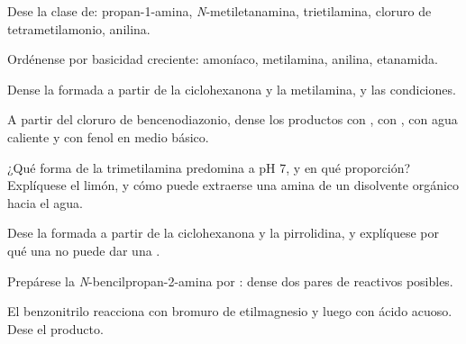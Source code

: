 \begin{exercise}[$\star$]\label{exo:b2:amines:1}
Dese la clase de: propan-1-amina, \textit{N}-metiletanamina, trietilamina,
cloruro de tetrametilamonio, anilina.
\end{exercise}

\begin{exercise}[$\star$]\label{exo:b2:amines:2}
Ordénense por basicidad creciente: amoníaco, metilamina, anilina, etanamida.
\end{exercise}

\begin{exercise}[$\star$]\label{exo:b2:amines:3}
Dense la  formada a partir de la ciclohexanona y la metilamina, y las condiciones.
\end{exercise}

\begin{exercise}[$\star$]\label{exo:b2:amines:4}
A partir del cloruro de bencenodiazonio, dense los productos con , con , con agua caliente
y con fenol en medio básico.
\end{exercise}

\begin{exercise}[$\star\star$]\label{exo:b2:amines:5}
¿Qué forma de la trimetilamina predomina a pH 7, y en qué proporción? Explíquese el limón, y cómo puede
extraerse una amina de un disolvente orgánico hacia el agua.
\end{exercise}

\begin{exercise}[$\star\star$]\label{exo:b2:amines:6}
Dese la  formada a partir de la ciclohexanona y la pirrolidina, y explíquese por qué una 
no puede dar una .
\end{exercise}

\begin{exercise}[$\star\star$]\label{exo:b2:amines:7}
Prepárese la \textit{N}-bencilpropan-2-amina  por : dense dos
pares de reactivos posibles.
\end{exercise}

\begin{exercise}[$\star\star$]\label{exo:b2:amines:8}
El benzonitrilo reacciona con bromuro de etilmagnesio y luego con ácido acuoso. Dese el producto.
\end{exercise}

